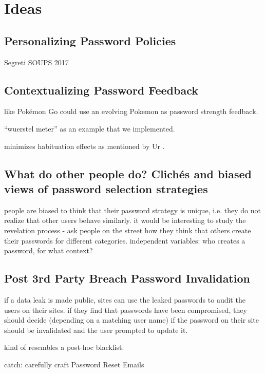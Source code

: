 \chapter[Ideas for Holistic Password Support]{Ideas}\label{chap:pst:ideas}

\section{Personalizing Password Policies}

Segreti \etal SOUPS 2017
\cite{Seitz2017PPT}
\cite{Segreti2017AdaptivePolicies}

\section{Contextualizing Password Feedback}
like \cite{Kroeze2012GamifyingAuthentication} Pokémon Go could use an evolving Pokemon as password strength feedback. 

``wuerstel meter'' as an example that we implemented.

minimizes habituation effects as mentioned by Ur \etal \cite{Ur2012HelpingUsersCreateBetterPasswords}.

\section{What do other people do? Clichés and biased views of password selection strategies}
people are biased to think that their password strategy is unique, i.e. they do not realize that other users behave similarly. it would be interesting to study the revelation process - ask people on the street how they think that others create their passwords for different categories. independent variables: who creates a password, for what context?

\section{Post 3rd Party Breach Password Invalidation}
if a data leak is made public, sites can use the leaked passwords to audit the users on their sites. if they find that passwords have been compromised, they should decide (depending on a matching user name) if the password on their site should be invalidated and the user prompted to update it.

kind of resembles a post-hoc blacklist.  

catch: carefully craft Password Reset Emails \cite{Kim2017TooBusy}

